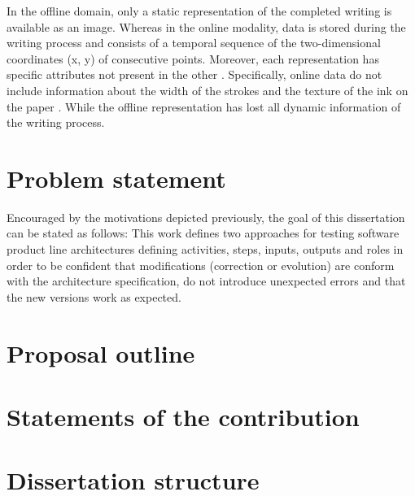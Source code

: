 In the offline domain, only a static representation of the completed writing is available as an image. Whereas in the online modality, data is stored during the writing process and consists of a temporal sequence of the two-dimensional coordinates (x, y) of consecutive points. Moreover, each representation has specific attributes not present in the other \cite{viard1999ireste}. Specifically, online data do not include information about the width of the strokes and the texture of the ink on the paper \cite{diaz2014generation}. While the offline representation has lost all dynamic information of the writing process. 

\section{Problem statement}
Encouraged by the motivations depicted previously, the goal of this dissertation can be stated as follows:
This work defines two approaches for testing software product line architectures defining activities, steps, inputs, outputs and roles in order to be confident that modifications
(correction or evolution) are conform with the architecture specification, do not introduce unexpected errors and that the new versions work as expected.

\section{Proposal outline}

\section{Statements of the contribution}

\section{Dissertation structure}






